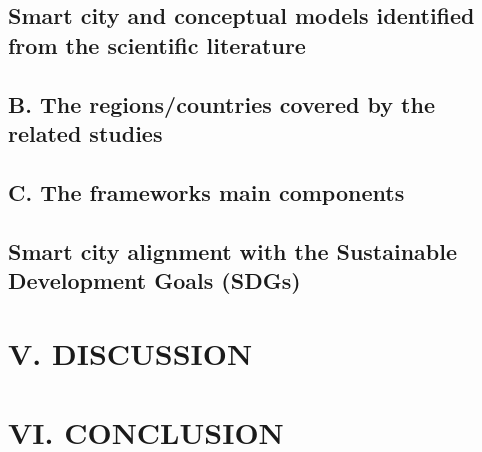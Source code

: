 \documentclass[a4paper,fleqn,spanish]{cas-dc}
\begin{document}
\lipsum[2]


\subsection{Smart city and conceptual models identified from the scientific literature}\label{sci-lit}

\lipsum[3-4]

\subsection{B. The regions/countries covered by the related studies}\label{regiones}

\lipsum[3-4]


\subsection{C. The frameworks main components}\label{componentes}

\lipsum[3-4]


\subsection{Smart city alignment with the Sustainable Development Goals (SDGs)}\label{sustentabilidad}

\lipsum[2-4]

\section{V. DISCUSSION}\label{discusion}

\lipsum[1]


\section{VI. CONCLUSION}\label{conclucion}

\lipsum[2-4]




%
%

%



%
\end{document}
